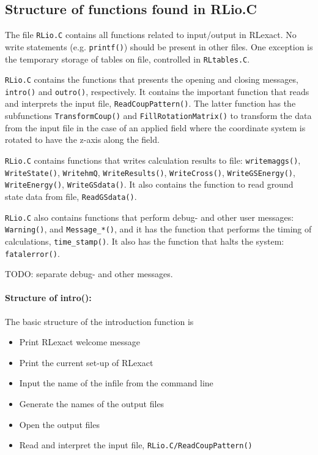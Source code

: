 \documentclass{article}
\begin{document}
\subsection{Structure of functions found in RLio.C}
The file \verb+RLio.C+ contains all functions related to input/output in RLexact. No write statements (e.g. \verb+printf()+)
should be present in other files. One exception is the temporary storage of tables on file, controlled in \verb+RLtables.C+.

\verb+RLio.C+ contains the functions that presents the opening and closing messages, \verb+intro()+ and \verb+outro()+, respectively.
It contains the important function that reads and interprets the input file, \verb+ReadCoupPattern()+.
The latter function has the subfunctions \verb+TransformCoup()+ and \verb+FillRotationMatrix()+ to transform the data from the input file in the case of an applied field where the coordinate system is rotated to have the z-axis along the field.

\verb+RLio.C+ contains functions that writes calculation results to file: \verb+writemaggs()+, \verb+WriteState()+, \verb+WritehmQ+, \verb+WriteResults()+, \verb+WriteCross()+, \verb+WriteGSEnergy()+, \verb+WriteEnergy()+, \verb+WriteGSdata()+. It also contains
the function to read ground state data from file, \verb+ReadGSdata()+.

\verb+RLio.C+ also contains functions that perform debug- and other user messages: \verb+Warning()+, and \verb+Message_*()+, and it has the function that performs the timing of calculations, \verb+time_stamp()+. It also has the function that halts the system: \verb+fatalerror()+.

TODO: separate debug- and other messages.

\paragraph{Structure of intro():} The basic structure of the introduction function is 
\begin{itemize}
\item Print RLexact welcome message
\item Print the current set-up of RLexact
\item Input the name of the infile from the command line
\item Generate the names of the output files
\item Open the output files
\item Read and interpret the input file, \verb+RLio.C/ReadCoupPattern()+
\end{itemize}
\end{document}
